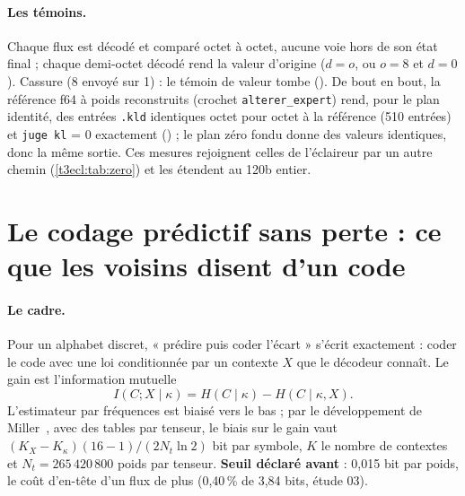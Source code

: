 \paragraph{Les témoins.} Chaque flux est décodé et comparé octet à octet, aucune voie hors de son état final ; chaque demi-octet décodé rend la valeur d'origine ($d = o$, ou $o = 8$ et $d = 0$). Cassure (8 envoyé sur 1) : le témoin de valeur tombe (). De bout en bout, la référence f64 à poids reconstruits (crochet \texttt{alterer\_expert}) rend, pour le plan identité, des entrées \texttt{.kld} identiques octet pour octet à la référence (510 entrées) et \texttt{juge kl} = 0 exactement () ; le plan zéro fondu donne des valeurs identiques, donc la même sortie. Ces mesures rejoignent celles de l'éclaireur par un autre chemin (\cref{t3ecl:tab:zero}) et les étendent au 120b entier.

\section{Le codage prédictif sans perte : ce que les voisins disent d'un code}\label{t3pre:sec:predictif}

\paragraph{Le cadre.} Pour un alphabet discret, « prédire puis coder l'écart » s'écrit exactement : coder le code avec une loi conditionnée par un contexte $X$ que le décodeur connaît. Le gain est l'information mutuelle
\begin{equation}\label{t3pre:eq:im}
I(C ; X \mid \kappa) = H(C \mid \kappa) - H(C \mid \kappa, X).
\end{equation}
L'estimateur par fréquences est biaisé vers le bas ; par le développement de Miller~\cite{miller1955bias}, avec des tables par tenseur, le biais sur le gain vaut $(K_X - K_\kappa)(16 - 1)/(2 N_t \ln 2)$ bit par symbole, $K$ le nombre de contextes et $N_t = 265\,420\,800$ poids par tenseur. \textbf{Seuil déclaré avant} : 0,015 bit par poids, le coût d'en-tête d'un flux de plus (0,40\,\% de 3,84 bits, étude 03).


